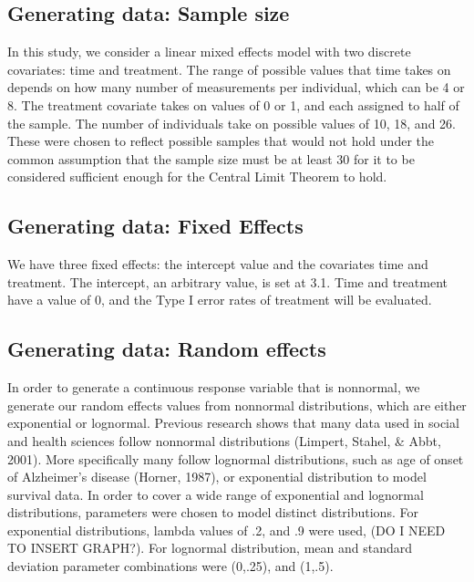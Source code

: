 \documentclass[12pt, twoside]{amherstthesis}
\begin{document}
\hypertarget{generating-data-sample-size}{%
\subsection{Generating data: Sample size}\label{generating-data-sample-size}}

In this study, we consider a linear mixed effects model with two discrete covariates: time and treatment. The range of possible values that time takes on depends on how many number of measurements per individual, which can be 4 or 8. The treatment covariate takes on values of 0 or 1, and each assigned to half of the sample. The number of individuals take on possible values of 10, 18, and 26. These were chosen to reflect possible samples that would not hold under the common assumption that the sample size must be at least 30 for it to be considered sufficient enough for the Central Limit Theorem to hold.

\hypertarget{generating-data-fixed-effects}{%
\subsection{Generating data: Fixed Effects}\label{generating-data-fixed-effects}}

We have three fixed effects: the intercept value and the covariates time and treatment. The intercept, an arbitrary value, is set at 3.1. Time and treatment have a value of 0, and the Type I error rates of treatment will be evaluated.

\hypertarget{generating-data-random-effects}{%
\subsection{Generating data: Random effects}\label{generating-data-random-effects}}

In order to generate a continuous response variable that is nonnormal, we generate our random effects values from nonnormal distributions, which are either exponential or lognormal. Previous research shows that many data used in social and health sciences follow nonnormal distributions (Limpert, Stahel, \& Abbt, 2001). More specifically many follow lognormal distributions, such as age of onset of Alzheimer's disease (Horner, 1987), or exponential distribution to model survival data. In order to cover a wide range of exponential and lognormal distributions, parameters were chosen to model distinct distributions. For exponential distributions, lambda values of .2, and .9 were used, (DO I NEED TO INSERT GRAPH?). For lognormal distribution, mean and standard deviation parameter combinations were (0,.25), and (1,.5).
\end{document}
